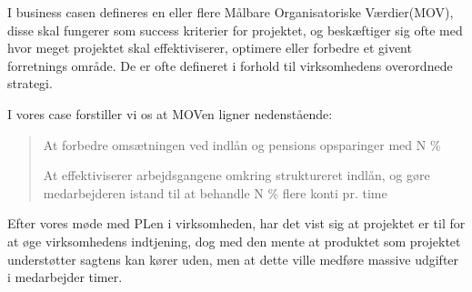 I business casen defineres en eller flere Målbare Organisatoriske Værdier(MOV),
disse skal fungerer som success kriterier for projektet, og beskæftiger sig
ofte med hvor meget projektet skal effektiviserer, optimere eller forbedre et
givent forretnings område. De er ofte defineret i forhold til virksomhedens
overordnede strategi.

I vores case forstiller vi os at MOVen ligner nedenstående:

\begin{quote}
At forbedre omsætningen ved indlån og pensions opsparinger med N \%

At effektiviserer arbejdsgangene omkring struktureret indlån, og gøre
medarbejderen istand til at behandle N \% flere konti pr. time
\end{quote}

Efter vores møde med PLen i virksomheden, har det vist sig at projektet er til
for at øge virksomhedens indtjening, dog med den mente at produktet som
projektet understøtter sagtens kan kører uden, men at dette ville medføre
massive udgifter i medarbejder timer.
